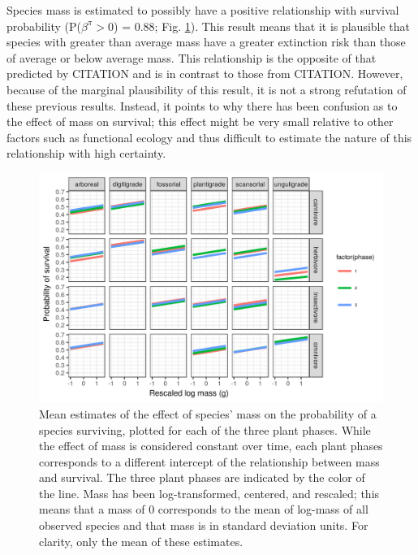 \documentclass[12pt,letterpaper]{article}
\begin{document}
Species mass is estimated to possibly have a positive relationship with survival probability (P(\(\beta^{\pi} > 0\)) = 0.88; Fig. \ref{fig:mass_survival}). This result means that it is plausible that species with greater than average mass have a greater extinction risk than those of average or below average mass. This relationship is the opposite of that predicted by CITATION and is in contrast to those from CITATION. However, because of the marginal plausibility of this result, it is not a strong refutation of these previous results. Instead, it points to why there has been confusion as to the effect of mass on survival; this effect might be very small relative to other factors such as functional ecology and thus difficult to estimate the nature of this relationship with high certainty.
\begin{figure}[ht]
  \centering
  \includegraphics[width=\textwidth,height=0.4\textheight,keepaspectratio=true]{figure/mass_on_surv_bd}
  \caption{Mean estimates of the effect of species' mass on the probability of a species surviving, plotted for each of the three plant phases. While the effect of mass is considered constant over time, each plant phases corresponds to a different intercept of the relationship between mass and survival. The three plant phases are indicated by the color of the line. Mass has been log-transformed, centered, and rescaled; this means that a mass of 0 corresponds to the mean of log-mass of all observed species and that mass is in standard deviation units. For clarity, only the mean of these estimates.}
  \label{fig:mass_survival}
\end{figure}
\end{document}
